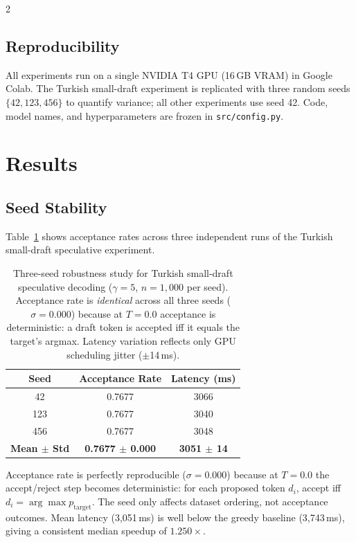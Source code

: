 \documentclass[11pt,a4paper]{article}
\begin{document}
\begin{multicols}{2}
\subsection{Reproducibility}

All experiments run on a single NVIDIA T4 GPU (16\,GB VRAM) in Google
Colab.
The Turkish small-draft experiment is replicated with three random seeds
$\{42, 123, 456\}$ to quantify variance; all other experiments use seed 42.
Code, model names, and hyperparameters are frozen in \texttt{src/config.py}.

\section{Results}
\label{sec:results}

\subsection{Seed Stability}
\label{sec:seeds}

Table~\ref{tab:seeds} shows acceptance rates across three independent
runs of the Turkish small-draft speculative experiment.

\begin{table}[t]
\centering
\small
\begin{tabular}{ccc}
\toprule
\textbf{Seed} & \textbf{Acceptance Rate} & \textbf{Latency (ms)} \\
\midrule
42  & 0.7677 & 3066 \\
123 & 0.7677 & 3040 \\
456 & 0.7677 & 3048 \\
\midrule
\textbf{Mean $\pm$ Std} & \textbf{0.7677 $\pm$ 0.000} & \textbf{3051 $\pm$ 14} \\
\bottomrule
\end{tabular}
\caption{Three-seed robustness study for Turkish small-draft speculative
decoding ($\gamma=5$, $n=1{,}000$ per seed).
Acceptance rate is \emph{identical} across all three seeds ($\sigma=0.000$)
because at $T=0.0$ acceptance is deterministic: a draft token is accepted
iff it equals the target's argmax. Latency variation reflects only
GPU scheduling jitter ($\pm$14\,ms).}
\label{tab:seeds}
\end{table}

Acceptance rate is perfectly reproducible ($\sigma=0.000$) because at
$T=0.0$ the accept/reject step becomes deterministic: for each proposed
token $d_i$, accept iff $d_i = \arg\max p_{\mathrm{target}}$.
The seed only affects dataset ordering, not acceptance outcomes.
Mean latency (3,051\,ms) is well below the greedy baseline (3,743\,ms),
giving a consistent median speedup of $1.250\!\times$.


\end{multicols}
\end{document}
